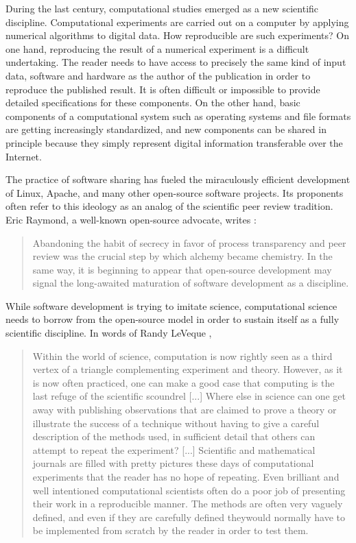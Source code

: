 During the last century, computational studies emerged as a new
scientific discipline. Computational experiments are carried out on a
computer by applying numerical algorithms to digital data. How
reproducible are such experiments? On one hand, reproducing the result
of a numerical experiment is a difficult undertaking. The reader needs
to have access to precisely the same kind of input data, software and
hardware as the author of the publication in order to reproduce the
published result. It is often difficult or impossible to provide
detailed specifications for these components. On the other hand, basic
components of a computational system such as operating systems and
file formats are getting increasingly standardized, and new components
can be shared in principle because they simply represent digital
information transferable over the Internet.

The practice of software sharing has fueled the miraculously efficient
development of Linux, Apache, and many other open-source software
projects.  Its proponents often refer to this ideology as an analog of
the scientific peer review tradition. Eric Raymond, a well-known
open-source advocate, writes \cite[]{taoup}:
\begin{quote}
  Abandoning the habit of secrecy in favor of process transparency and
  peer review was the crucial step by which alchemy became chemistry.
  In the same way, it is beginning to appear that open-source
  development may signal the long-awaited maturation of software
  development as a discipline.
\end{quote}
While software development is trying to imitate science, computational
science needs to borrow from the open-source model in order to sustain
itself as a fully scientific discipline. In words of Randy LeVeque
\cite[]{randy},
\begin{quote}
  Within the world of science, computation is now rightly seen as a third vertex of a
triangle complementing experiment and theory. However, as it is now often practiced,
one can make a good case that computing is the last refuge of the scientific scoundrel [...]
Where else in science can one get away with publishing observations that are
claimed to prove a theory or illustrate the success of a technique without having to
give a careful description of the methods used, in sufficient detail that others can
attempt to repeat the experiment? [...]
Scientific and mathematical journals are filled with pretty pictures these days of
computational experiments that the reader has no hope of repeating. Even brilliant
and well intentioned computational scientists often do a poor job of presenting their
work in a reproducible manner. The methods are often very vaguely defined, and even
if they are carefully defined theywould normally have to be implemented from scratch
by the reader in order to test them. 
\end{quote}

